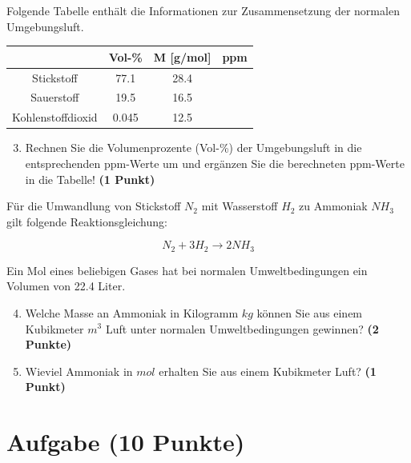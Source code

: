 \documentclass[a4paper, 10pt]{scrartcl}\usepackage[]{graphicx}\usepackage[]{xcolor}
\begin{document}
Folgende Tabelle enth{\"a}lt die Informationen zur Zusammensetzung der
normalen Umgebungsluft.

\begin{center}
  \begin{tabular}{ c|c|c|c }
     & Vol-\% & M [g/mol] & ppm \\
    \hline
    Stickstoff & 77.1 & 28.4 &
                                                    \phantom{1000000000000}\strut\\
        \hline
    Sauerstoff & 19.5 & 16.5 &
                                                    \phantom{10000000}\strut\\
        \hline
    Kohlenstoffdioxid & 0.045 & 12.5 & \phantom{10000000}\strut\\     
     \hline
\end{tabular}
\end{center}

\begin{enumerate}
   \setcounter{enumi}{2}
\item Rechnen Sie die Volumenprozente (Vol-\%) der Umgebungsluft in die
  entsprechenden ppm-Werte um und erg{\"a}nzen Sie die berechneten ppm-Werte in
  die Tabelle!  \textbf{(1 Punkt)}
\end{enumerate}

F{\"u}r die Umwandlung von Stickstoff $N_2$ mit Wasserstoff $H_2$ zu Ammoniak
$NH_3$ gilt folgende Reaktionsgleichung:

\begin{equation*}
  N_2 + 3H_2 \rightarrow 2NH_3
\end{equation*}  

Ein Mol eines beliebigen Gases hat bei normalen Umweltbedingungen ein
Volumen von 22.4 Liter. %

\begin{enumerate}
  \setcounter{enumi}{3}
\item Welche Masse an Ammoniak in Kilogramm $kg$ k{\"o}nnen Sie aus einem
  Kubikmeter $m^3$ Luft unter normalen Umweltbedingungen gewinnen?
  \textbf{(2 Punkte)}
\item Wieviel Ammoniak in $mol$ erhalten Sie aus einem Kubikmeter Luft?
  \textbf{(1 Punkt)}
\end{enumerate}

 
\clearpage

\section{Aufgabe \hfill (10 Punkte)}
\end{document}

